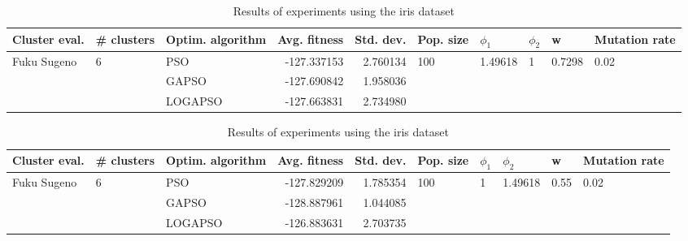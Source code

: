 \documentclass{article}
\begin{document}
\begin{table}
\centering
\caption{Results of experiments using the iris dataset}
\begin{tabular}{lllrrlllll}
\toprule
               Cluster eval. &        \# clusters & Optim. algorithm &  Avg. fitness &  Std. dev. &            Pop. size &               $\phi_{1}$ &         $\phi_{2}$ &                       w &         Mutation rate \\
\midrule
\multirow{3}{*}{Fuku Sugeno} & \multirow{3}{*}{6} &              PSO &   -127.337153 &   2.760134 & \multirow{3}{*}{100} & \multirow{3}{*}{1.49618} & \multirow{3}{*}{1} & \multirow{3}{*}{0.7298} & \multirow{3}{*}{0.02} \\
                             &                    &            GAPSO &   -127.690842 &   1.958036 &                      &                          &                    &                         &                       \\
                             &                    &          LOGAPSO &   -127.663831 &   2.734980 &                      &                          &                    &                         &                       \\
\bottomrule
\end{tabular}
\end{table}
\begin{table}
\centering
\caption{Results of experiments using the iris dataset}
\begin{tabular}{lllrrlllll}
\toprule
               Cluster eval. &        \# clusters & Optim. algorithm &  Avg. fitness &  Std. dev. &            Pop. size &         $\phi_{1}$ &               $\phi_{2}$ &                     w &         Mutation rate \\
\midrule
\multirow{3}{*}{Fuku Sugeno} & \multirow{3}{*}{6} &              PSO &   -127.829209 &   1.785354 & \multirow{3}{*}{100} & \multirow{3}{*}{1} & \multirow{3}{*}{1.49618} & \multirow{3}{*}{0.55} & \multirow{3}{*}{0.02} \\
                             &                    &            GAPSO &   -128.887961 &   1.044085 &                      &                    &                          &                       &                       \\
                             &                    &          LOGAPSO &   -126.883631 &   2.703735 &                      &                    &                          &                       &                       \\
\bottomrule
\end{tabular}
\end{table}
\end{document}
